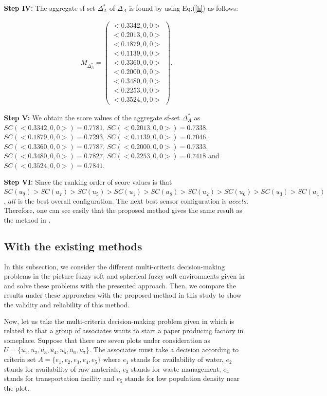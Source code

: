 \documentclass{IJFS}
\begin{document}
\textbf{Step IV:} The aggregate sf-set $\Delta_A^*$ of $\Delta_A$
is found by using Eq.(\ref{h}) as follows:
\begin{center}
\footnotesize{
\begin{eqnarray*}
 M_{\Delta_A^*}
= \left(
\begin{array}{c}
<0.3342,0,0> \\
<0.2013,0,0>\\
<0.1879,0,0>\\
<0.1139,0,0>\\
<0.3360,0,0>\\
<0.2000,0,0>\\
<0.3480,0,0>\\
<0.2253,0,0>\\
<0.3524,0,0>
\end{array} \right).
\end{eqnarray*}}
\end{center}
\textbf{Step V:} We obtain the score values of the
aggregate sf-set $\Delta_A^*$ as  $SC(<0.3342,0,0>)=0.7781$, $SC(<0.2013,0,0>)=0.7338$,  $SC(<0.1879,0,0>)=0.7293$,  $SC(<0.1139,0,0>)=0.7046$, \linebreak[4] $SC(<0.3360,0,0>)=0.7787$, $SC(<0.2000,0,0>)=0.7333$,  $SC(<0.3480,0,0>)=0.7827$, $SC(<0.2253,0,0>)=0.7418$ and  $SC(<0.3524,0,0>)=0.7841$.

\textbf{Step VI:} Since the ranking order of score values is that 
$SC(u_9)>SC(u_7)>SC(u_5)>SC(u_1)>SC(u_8)>SC(u_2)>SC(u_6)>SC(u_3)>SC(u_4)$,  $all$ is the best overall configuration. The next best
sensor configuration is $accels$. Therefore, one can see easily that the proposed method gives the same result as the method in \cite{wes}. 

\subsection{With the existing methods}
In this subsection, we consider the different multi-criteria decision-making problems in the picture fuzzy soft and spherical fuzzy soft environments given in \cite{ah, gul, per, yang} and solve these problems with the presented approach. Then, we compare the results under these approaches with the proposed method in this study to show the validity and reliability of this method.

Now, let us take the multi-criteria decision-making problem given in \cite{per} which
is related to that a group of associates wants to start a paper
producing factory in someplace. Suppose that there are seven plots
under consideration as $U = \{u_1, u_2, u_3, u_4, u_5, u_6,
u_7\}$. The associates must take a decision according to criteria
set $A = \{e_1, e_2, e_3, e_4, e_5\}$ where $e_1$ stands for
availability of water, $e_2$ stands for availability of raw
materials, $e_3$ stands for waste management, $e_4$ stands for
transportation facility and $e_5$ stands for low population
density near the plot.
\end{document}
